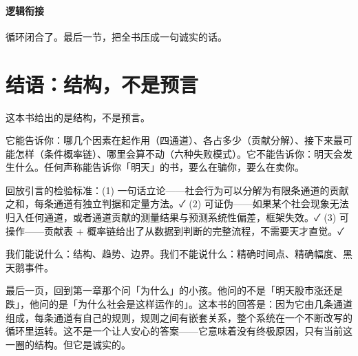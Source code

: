 \documentclass[../../main2.tex]{subfiles}
\begin{document}
	\paragraph*{逻辑衔接}
	循环闭合了。最后一节，把全书压成一句诚实的话。
	\section{结语：结构，不是预言}
	\label{sec:cl-coda}
	这本书给出的是结构，不是预言。

	它能告诉你：哪几个因素在起作用（四通道）、各占多少（贡献分解）、接下来最可能怎样（条件概率链）、哪里会算不动（六种失败模式）。它不能告诉你：明天会发生什么。任何声称能告诉你「明天」的书，要么在骗你，要么在卖你。

	回放引言的检验标准：(1) 一句话立论——社会行为可以分解为有限条通道的贡献之和，每条通道有独立判据和定量方法。✓ (2) 可证伪——如果某个社会现象无法归入任何通道，或者通道贡献的测量结果与预测系统性偏差，框架失效。✓ (3) 可操作——贡献表 + 概率链给出了从数据到判断的完整流程，不需要天才直觉。✓

	我们能说什么：结构、趋势、边界。我们不能说什么：精确时间点、精确幅度、黑天鹅事件。

	最后一页，回到第一章那个问「为什么」的小孩。他问的不是「明天股市涨还是跌」，他问的是「为什么社会是这样运作的」。这本书的回答是：因为它由几条通道组成，每条通道有自己的规则，规则之间有嵌套关系，整个系统在一个不断改写的循环里运转。这不是一个让人安心的答案——它意味着没有终极原因，只有当前这一圈的结构。但它是诚实的。
\end{document}
